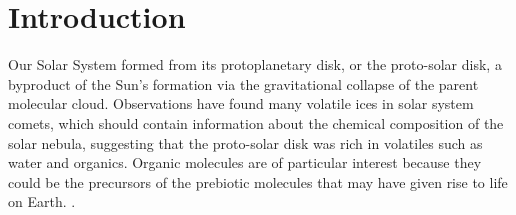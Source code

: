 \documentclass[twocolumn, twocolappendix, astrosymb, times]{aastex631}
\begin{document}

\section{Introduction} \label{sec:intro}
Our Solar System formed from its protoplanetary disk, or the proto-solar disk, a byproduct of the Sun's formation via the gravitational collapse of the parent molecular cloud. Observations have found many volatile ices in solar system comets, which should contain information about the chemical composition of the solar nebula, suggesting that the proto-solar disk was rich in volatiles such as water and organics. Organic molecules are of particular interest because they could be the precursors of the prebiotic molecules that may have given rise to life on Earth. \citep{Ceccarelli2023}.
\end{document}

